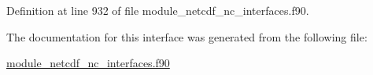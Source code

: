 Definition at line 932 of file module\+\_\+netcdf\+\_\+nc\+\_\+interfaces.\+f90.



The documentation for this interface was generated from the following file\+:\begin{DoxyCompactItemize}
\item 
\hyperlink{module__netcdf__nc__interfaces_8f90}{module\+\_\+netcdf\+\_\+nc\+\_\+interfaces.\+f90}\end{DoxyCompactItemize}
